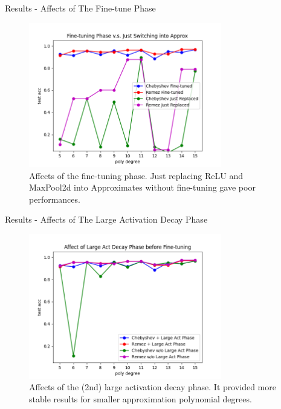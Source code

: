 \documentclass[9pt]{beamer}
\begin{document}
\begin{frame}{Results - Affects of The Fine-tune Phase}
    \begin{figure}[!h]
        \centering
        \includegraphics[width=0.75\textwidth]{resource/finetune.png}
        \caption{Affects of the fine-tuning phase. Just replacing ReLU and MaxPool2d into Approximates without fine-tuning gave poor performances.}
        \label{fig:affects_finetune}
    \end{figure}
\end{frame}

\begin{frame}{Results - Affects of The Large Activation Decay Phase}
    \begin{figure}[!h]
        \centering
        \includegraphics[width=0.75\textwidth]{resource/act.png}
        \caption{Affects of the (2nd) large activation decay phase. It provided more stable results for smaller approximation polynomial degrees.}
        \label{fig:affects_act}
    \end{figure}
\end{frame}
\end{document}

